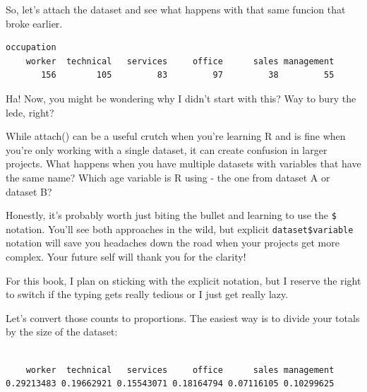 \documentclass[
  letterpaper,
]{book}
\newenvironment{Shaded}{\begin{snugshade}}{\end{snugshade}}
\newcommand{\CommentTok}[1]{\textcolor[rgb]{0.37,0.37,0.37}{#1}}
\newcommand{\FunctionTok}[1]{\textcolor[rgb]{0.28,0.35,0.67}{#1}}
\newcommand{\NormalTok}[1]{\textcolor[rgb]{0.00,0.23,0.31}{#1}}
\newcommand{\SpecialCharTok}[1]{\textcolor[rgb]{0.37,0.37,0.37}{#1}}
\begin{document}
\begin{tcolorbox}
So, let's attach the dataset and see what happens with that same funcion
that broke earlier.

\begin{Shaded}
\end{Shaded}

\begin{verbatim}
occupation
    worker  technical   services     office      sales management 
       156        105         83         97         38         55 
\end{verbatim}

Ha! Now, you might be wondering why I didn't start with this? Way to
bury the lede, right?

While attach() can be a useful crutch when you're learning R and is fine
when you're only working with a single dataset, it can create confusion
in larger projects. What happens when you have multiple datasets with
variables that have the same name? Which age variable is R using - the
one from dataset A or dataset B?

Honestly, it's probably worth just biting the bullet and learning to use
the \texttt{\$} notation. You'll see both approaches in the wild, but
explicit \texttt{dataset\$variable} notation will save you headaches
down the road when your projects get more complex. Your future self will
thank you for the clarity!

For this book, I plan on sticking with the explicit notation, but I
reserve the right to switch if the typing gets really tedious or I just
get really lazy.

\end{tcolorbox}

Let's convert those counts to proportions. The easiest way is to divide
your totals by the size of the dataset:

\begin{Shaded}
\end{Shaded}

\begin{verbatim}

    worker  technical   services     office      sales management 
0.29213483 0.19662921 0.15543071 0.18164794 0.07116105 0.10299625 
\end{verbatim}
\end{document}
